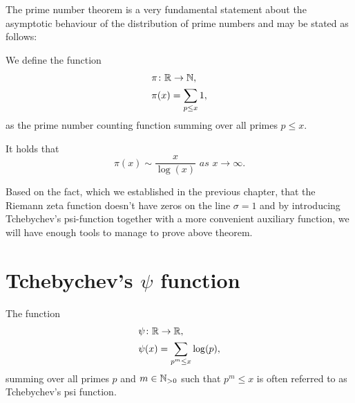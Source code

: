The prime number theorem is a very fundamental statement about the asymptotic behaviour of the distribution of prime numbers and may be stated as follows:

\begin{definition}
	We define the function
\begin{equation*}
\begin{aligned}
	&\pi \colon \mathbb{R} \to \mathbb{N}, \\
	&\pi(x) = \sum _{p \leq x} 1,
\end{aligned}
\end{equation*}
	as the prime number counting function summing over all primes $p \leq x$.
\end{definition}


\begin{theorem}
	It holds that 
\begin{equation*}
	\pi(x) \sim \frac{x}{\log(x)} \textit{ as } x \to \infty.
\end{equation*}
\end{theorem}

Based on the fact, which we established in the previous chapter, that the Riemann zeta function doesn't have zeros on the line $\sigma = 1$ and by introducing Tchebychev's psi-function together with a more convenient auxiliary function, we will have enough tools to manage to prove above theorem.

\section{Tchebychev's $\psi$ function}


\begin{definition}
	The function
\begin{equation*}
\begin{aligned}
	&\psi \colon \mathbb{R} \to \mathbb{R}, \\
	&\psi(x) = \sum _{p^m \leq x} \log(p),
\end{aligned}
\end{equation*}
	summing over all primes $p$ and $m \in \mathbb{N}_{> 0}$ such that $p^m \leq x$ is often referred to as Tchebychev's psi function.
\end{definition}



